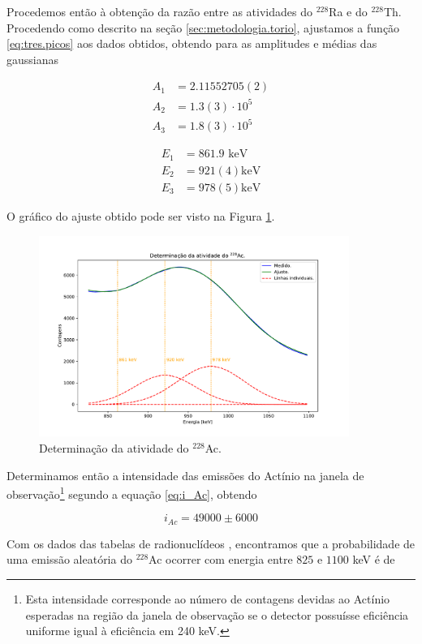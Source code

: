 \documentclass[a4paper, 11pt, notitlepage]{article}
\numberwithin{equation}{section}  %
\begin{document}
Procedemos então à obtenção da razão entre as atividades do ${}^{228}$Ra e do ${}^{228}$Th. Procedendo como descrito na seção \ref{sec:metodologia.torio}, ajustamos a função \eqref{eq:tres.picos} aos dados obtidos, obtendo para as amplitudes e médias das gaussianas

\begin{align*}
  A_1 &= 2.11552705(2)  \\
  A_2 &= 1.3(3) \cdot 10^5 \\
  A_3 &= 1.8(3) \cdot 10^5
\end{align*}

\begin{align*}
  E_1 &= 861.9 \text{ keV} \\
  E_2 &= 921(4) \text{keV} \\
  E_3 &= 978(5) \text{keV}
\end{align*}

O gráfico do ajuste obtido pode ser visto na Figura \ref{fig:atividade.ac}.

\begin{figure}[H]
  \centering
  \includegraphics[width=0.9\textwidth]{atividade_ac.pdf}
  \caption{Determinação da atividade do ${}^{228}$Ac.}
  \label{fig:atividade.ac}
\end{figure}

Determinamos então a intensidade das emissões do Actínio na janela de observação\footnote{Esta intensidade corresponde ao número de contagens devidas ao Actínio esperadas na região da janela de observação se o detector possuísse eficiência uniforme igual à eficiência em 240 keV.} segundo a equação \eqref{eq:i_Ac}, obtendo

\[i_{Ac} = 49000 \pm 6000 \]

Com os dados das tabelas de radionuclídeos \cite{TabRad_v6}, encontramos que a probabilidade de uma emissão aleatória do ${}^{228}$Ac ocorrer com energia entre $825$ e $1100$ keV é de
\end{document}
